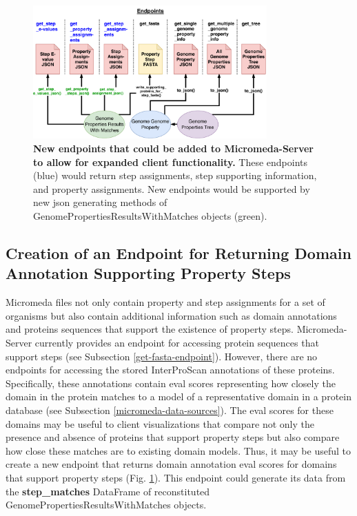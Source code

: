 \begin{figure}[!ht]
  \centering
	\includegraphics[width=0.8\textwidth]{media/micromeda-server-new-endpoints.pdf}
	 \caption[New endpoints that could be added to Micromeda-Server to allow for 
expanded client functionality.]{\textbf{New endpoints that could be added to 
Micromeda-Server to allow for expanded client functionality.} These endpoints 
(blue) would return step assignments, step supporting information, and property 
assignments. New endpoints would be supported by new \gls{json} generating 
methods of GenomePropertiesResultsWithMatches objects (green).}
	 \label{fig:new_endpoints}
\end{figure}

\subsection{Creation of an Endpoint for Returning Domain Annotation Supporting 
Property Steps} \label{e-value-endpoint}

Micromeda files not only contain property and step assignments for a set of 
organisms but also contain additional information such as domain annotations and 
proteins sequences that support the existence of property steps. 
Micromeda-Server currently provides an endpoint for accessing protein sequences 
that support steps (see Subsection \ref{get-fasta-endpoint}). However, there are 
no endpoints for accessing the stored InterProScan annotations of these 
proteins. Specifically, these annotations contain \gls{eval} scores representing 
how closely the domain in the protein matches to a model of a representative 
domain in a protein database (see Subsection \ref{micromeda-data-sources}). The 
\gls{eval} scores for these domains may be useful to client visualizations that 
compare not only the presence and absence of proteins that support property 
steps but also compare how close these matches are to existing domain models. 
Thus, it may be useful to create a new endpoint that returns domain annotation 
\gls{eval} scores for domains that support property steps (Fig. 
\ref{fig:new_endpoints}). This endpoint could generate its data from the 
\textbf{step\_matches} DataFrame of reconstituted 
GenomePropertiesResultsWithMatches objects.

